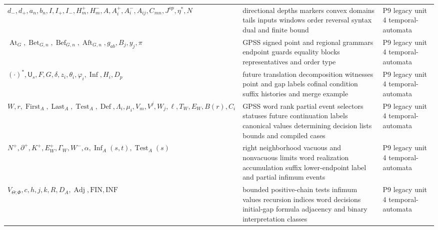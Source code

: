 \begin{longtable}{@{}p{}p{}p{}@{}}
\(d_-,\allowbreak d_+,\allowbreak a_n,\allowbreak b_n,\allowbreak I,\allowbreak I_+,\allowbreak I_-,\allowbreak H_m^+,\allowbreak H_m^-,\allowbreak A,\allowbreak A_i^+,\allowbreak A_i^-,\allowbreak A_{ij},\allowbreak C_{mn},\allowbreak J^{op},\allowbreak \eta^*,\allowbreak N\) & directional depths markers convex domains tails inputs windows order reversal syntax dual and finite bound & P9 legacy unit 4 temporal-\allowbreak{}automata \\
\(\operatorname{At}_G,\allowbreak \operatorname{Bet}_{G,n},\allowbreak \operatorname{Bef}_{G,n},\allowbreak \operatorname{Aft}_{G,n},\allowbreak g_{ab},\allowbreak B_j,\allowbreak y_j,\allowbreak \pi\) & GPSS signed point and regional grammars endpoint guards equality blocks representatives and order type & P9 legacy unit 4 temporal-\allowbreak{}automata \\
\((\cdot)^*,\allowbreak \mathsf U_s,\allowbreak F,\allowbreak G,\allowbreak \delta,\allowbreak z_i,\allowbreak \theta_i,\allowbreak \varphi_i,\allowbreak \operatorname{Inf},\allowbreak H_i,\allowbreak D_p\) & future translation decomposition witnesses point and gap labels cofinal condition suffix histories and merge example & P9 legacy unit 4 temporal-\allowbreak{}automata \\
\(W,\allowbreak r,\allowbreak \operatorname{First}_A,\allowbreak \operatorname{Last}_A,\allowbreak \operatorname{Test}_A,\allowbreak \operatorname{Def},\allowbreak \Lambda_i,\allowbreak \mu_i,\allowbreak V_m,\allowbreak V^j,\allowbreak W_j,\allowbreak \ell,\allowbreak T_W,\allowbreak E_W,\allowbreak B(r),\allowbreak C_i\) & GPSS word rank partial event selectors statuses future continuation labels canonical values determining decision lists bounds and compiled cases & P9 legacy unit 4 temporal-\allowbreak{}automata \\
\(N^+,\allowbreak \partial^+,\allowbreak K^+,\allowbreak E_W^+,\allowbreak \Gamma_W,\allowbreak W^-,\allowbreak \alpha,\allowbreak \operatorname{Inf}_A(s,\allowbreak t),\allowbreak \operatorname{Test}_A(s)\) & right neighborhood vacuous and nonvacuous limits word realization accumulation suffix lower-endpoint label and partial infimum events & P9 legacy unit 4 temporal-\allowbreak{}automata \\
\(V_{\Theta;\Phi},\allowbreak c,\allowbreak h,\allowbreak j,\allowbreak k,\allowbreak R,\allowbreak D_A,\allowbreak \operatorname{Adj},\allowbreak \mathrm{FIN},\allowbreak \mathrm{INF}\) & bounded positive-chain tests infimum values recursion indices word decisions initial-gap formula adjacency and binary interpretation classes & P9 legacy unit 4 temporal-\allowbreak{}automata \\

\end{longtable}
